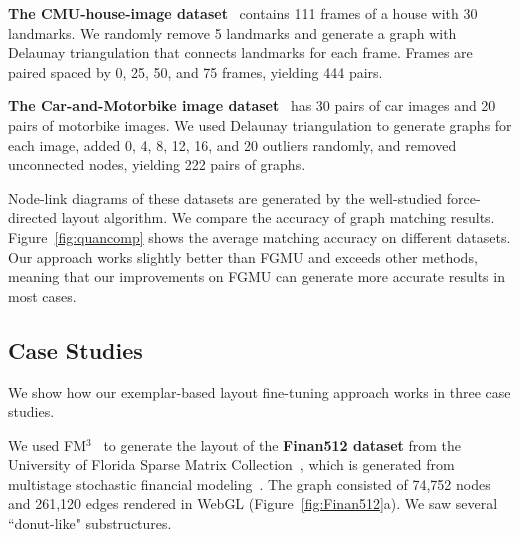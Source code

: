 \begin{compactenum}[\bfseries 1)]

\item \textbf{The CMU-house-image dataset}~\cite{zhou2012factorized} %
contains 111 frames of a house with 30 landmarks. We randomly remove 5 landmarks and generate a graph with Delaunay triangulation that connects landmarks for each frame. Frames are paired spaced by 0, 25, 50, and 75 frames, yielding 444 pairs.

\item \textbf{The Car-and-Motorbike image dataset}~\cite{DBLP:journals/ijcv/LeordeanuSH12} has 30 pairs of car images and 20 pairs of motorbike images. %
We used Delaunay triangulation to generate graphs for each image, added 0, 4, 8, 12, 16, and 20 outliers randomly, and removed unconnected nodes, yielding 222 pairs of graphs.

\end{compactenum}

Node-link diagrams of these datasets are generated by the well-studied force-directed layout algorithm. We compare the accuracy of graph matching results. Figure~\ref{fig:quancomp} shows the average matching accuracy on different datasets. Our approach works slightly better than FGMU and exceeds other methods, meaning that our improvements on FGMU can generate more accurate results in most cases. 


\subsection{Case Studies}
We show how our exemplar-based layout fine-tuning approach works in three case studies.

We used FM$^3$~\cite{hachul2004drawing} to generate the layout of the \textbf{Finan512 dataset} from the University of Florida Sparse Matrix Collection~\cite{10.1145/2049662.2049663}, which is generated from multistage stochastic financial modeling~\cite{DBLP:journals/jgo/SoperWC04}. 
The graph consisted of 74,752 nodes and 261,120 edges rendered in WebGL 
(Figure~\ref{fig:Finan512}a). 
We saw several ``donut-like" substructures.

